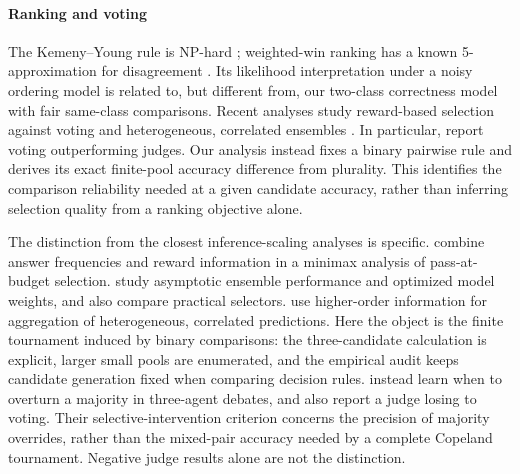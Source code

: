 \documentclass[preprint,11pt,number,sort&compress]{elsarticle}
\begin{document}
\paragraph{Ranking and voting}
The Kemeny--Young rule \citep{kemeny1959mathematics,young1978kemeny}
is NP-hard \citep{bartholdi1989voting}; weighted-win ranking has a known
5-approximation for disagreement \citep{coppersmith2006ordering}.
Its likelihood interpretation under a noisy ordering model
\citep{young1988condorcet,caragiannis2016noisy} is related to, but different from, our
two-class correctness model with fair same-class comparisons.
Recent analyses study reward-based selection against voting
\citep{di2025bom,komiyama2025bestofinf} and heterogeneous, correlated
ensembles \citep{ai2025beyondmv}. In particular,
\citet{komiyama2025bestofinf} report voting outperforming judges.
Our analysis instead fixes a binary pairwise rule and derives its exact
finite-pool accuracy difference from plurality. This identifies the
comparison reliability needed at a given candidate accuracy, rather than
inferring selection quality from a ranking objective alone.

The distinction from the closest inference-scaling analyses is specific.
\citet{di2025bom} combine answer frequencies and reward information in a
minimax analysis of pass-at-budget selection. \citet{komiyama2025bestofinf}
study asymptotic ensemble performance and optimized model weights, and
also compare practical selectors. \citet{ai2025beyondmv} use higher-order
information for aggregation of heterogeneous, correlated predictions.
Here the object is the finite tournament induced by binary comparisons:
the three-candidate calculation is explicit, larger small pools are
enumerated, and the empirical audit keeps candidate generation fixed
when comparing decision rules.
\citet{he2026minority} instead learn when to overturn a majority in
three-agent debates, and also report a judge losing to voting. Their
selective-intervention criterion concerns the precision of majority
overrides, rather than the mixed-pair accuracy needed by a complete
Copeland tournament. Negative judge results alone are not the distinction.
\end{document}

